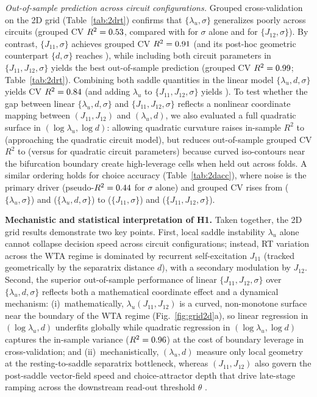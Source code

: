 \documentclass[11pt]{article}
\begin{document}
	\emph{Out-of-sample prediction across circuit configurations.} Grouped cross-validation on the 2D grid (Table~\ref{tab:2drt}) confirms that $\{\lambda_u,\sigma\}$ generalizes poorly across circuits (grouped CV $R^2=0.53$, compared with \ddRTSigCV{} for $\sigma$ alone and \ddRTJTwCV{} for $\{J_{12},\sigma\}$). By contrast, $\{J_{11},\sigma\}$ achieves grouped CV $R^2=0.91$ (and its post-hoc geometric counterpart $\{d,\sigma\}$ reaches \ddRTDCV), while including both circuit parameters in $\{J_{11},J_{12},\sigma\}$ yields the best out-of-sample prediction (grouped CV $R^2=0.99$; Table~\ref{tab:2drt}). Combining both saddle quantities in the linear model $\{\lambda_u,d,\sigma\}$ yields CV $R^2=0.84$ (and adding $\lambda_u$ to $\{J_{11},J_{12},\sigma\}$ yields \ddRTLamJCV). To test whether the gap between linear $\{\lambda_u,d,\sigma\}$ and $\{J_{11},J_{12},\sigma\}$ reflects a nonlinear coordinate mapping between $(J_{11},J_{12})$ and $(\lambda_u,d)$, we also evaluated a full quadratic surface in $(\log\lambda_u,\log d)$: allowing quadratic curvature raises in-sample $R^2$ to \ddRTGeoQuadR{} (approaching the quadratic circuit model), but reduces out-of-sample grouped CV $R^2$ to \ddRTGeoQuadCV{} (versus \ddRTQuadCV{} for quadratic circuit parameters) because curved iso-contours near the bifurcation boundary create high-leverage cells when held out across folds. A similar ordering holds for choice accuracy (Table~\ref{tab:2dacc}), where noise is the primary driver (pseudo-$R^2=0.44$ for $\sigma$ alone) and grouped CV rises from \ddAccLamCV{} ($\{\lambda_u,\sigma\}$) and \ddAccGeoCV{} ($\{\lambda_u,d,\sigma\}$) to \ddAccJElCV{} ($\{J_{11},\sigma\}$) and \ddAccJJCV{} ($\{J_{11},J_{12},\sigma\}$).
	
	\textbf{Mechanistic and statistical interpretation of H1.} Taken together, the 2D grid results demonstrate two key points. First, local saddle instability $\lambda_u$ alone cannot collapse decision speed across circuit configurations; instead, RT variation across the WTA regime is dominated by recurrent self-excitation $J_{11}$ (tracked geometrically by the separatrix distance $d$), with a secondary modulation by $J_{12}$. Second, the superior out-of-sample performance of linear $\{J_{11},J_{12},\sigma\}$ over $\{\lambda_u,d,\sigma\}$ reflects both a mathematical coordinate effect and a dynamical mechanism: (i)~mathematically, $\lambda_u(J_{11},J_{12})$ is a curved, non-monotone surface near the boundary of the WTA regime (Fig.~\ref{fig:grid2d}a), so linear regression in $(\log\lambda_u, d)$ underfits globally while quadratic regression in $(\log\lambda_u,\log d)$ captures the in-sample variance ($R^2=0.96$) at the cost of boundary leverage in cross-validation; and (ii)~mechanistically, $(\lambda_u,d)$ measure only local geometry at the resting-to-saddle separatrix bottleneck, whereas $(J_{11},J_{12})$ also govern the post-saddle vector-field speed and choice-attractor depth that drive late-stage ramping across the downstream read-out threshold $\theta$ \citep{WongHuk2008, Standage2011}.
	
\end{document}
